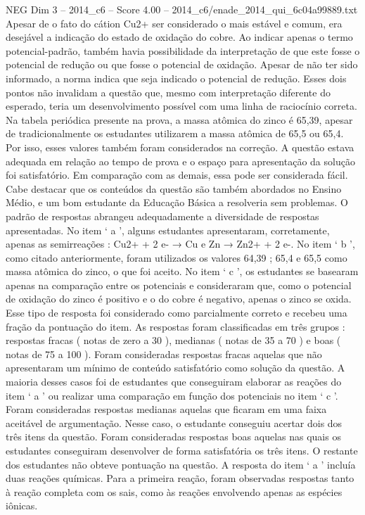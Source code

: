 \begin{textsample}{NEG Dim 3 – 2014\_c6 – Score 4.00 – 2014\_c6/enade\_2014\_qui\_6c04a99889.txt}
Apesar de o fato do cátion Cu2+ ser considerado o mais estável e comum, era desejável a indicação do estado de oxidação do cobre.
Ao indicar apenas o termo potencial-padrão, também havia possibilidade da interpretação de que este fosse o potencial de redução ou que fosse o potencial de oxidação.
Apesar de não ter sido informado, a norma indica que seja indicado o potencial de redução.
Esses dois pontos não invalidam a questão que, mesmo com interpretação diferente do esperado, teria um desenvolvimento possível com uma linha de raciocínio correta.
Na tabela periódica presente na prova, a massa atômica do zinco é 65,39, apesar de tradicionalmente os estudantes utilizarem a massa atômica de 65,5 ou 65,4.
Por isso, esses valores também foram considerados na correção.
A questão estava adequada em relação ao tempo de prova e o espaço para apresentação da solução foi satisfatório.
Em comparação com as demais, essa pode ser considerada fácil.
Cabe destacar que os conteúdos da questão são também abordados no Ensino Médio, e um bom estudante da Educação Básica a resolveria sem problemas.
O padrão de respostas abrangeu adequadamente a diversidade de respostas apresentadas.
No item ‘ a ’, alguns estudantes apresentaram, corretamente, apenas as semirreações : Cu2+ + 2 e- → Cu e Zn → Zn2+ + 2 e-.
No item ‘ b ’, como citado anteriormente, foram utilizados os valores 64,39 ; 65,4 e 65,5 como massa atômica do zinco, o que foi aceito.
No item ‘ c ’, os estudantes se basearam apenas na comparação entre os potenciais e consideraram que, como o potencial de oxidação do zinco é positivo e o do cobre é negativo, apenas o zinco se oxida.
Esse tipo de resposta foi considerado como parcialmente correto e recebeu uma fração da pontuação do item.
As respostas foram classificadas em três grupos : respostas fracas ( notas de zero a 30 ), medianas ( notas de 35 a 70 ) e boas ( notas de 75 a 100 ).
Foram consideradas respostas fracas aquelas que não apresentaram um mínimo de conteúdo satisfatório como solução da questão.
A maioria desses casos foi de estudantes que conseguiram elaborar as reações do item ‘ a ’ ou realizar uma comparação em função dos potenciais no item ‘ c ’.
Foram consideradas respostas medianas aquelas que ficaram em uma faixa aceitável de argumentação.
Nesse caso, o estudante conseguiu acertar dois dos três itens da questão.
Foram consideradas respostas boas aquelas nas quais os estudantes conseguiram desenvolver de forma satisfatória os três itens.
O restante dos estudantes não obteve pontuação na questão.
A resposta do item ‘ a ’ incluía duas reações químicas.
Para a primeira reação, foram observadas respostas tanto à reação completa com os sais, como às reações envolvendo apenas as espécies iônicas.

\end{textsample}
